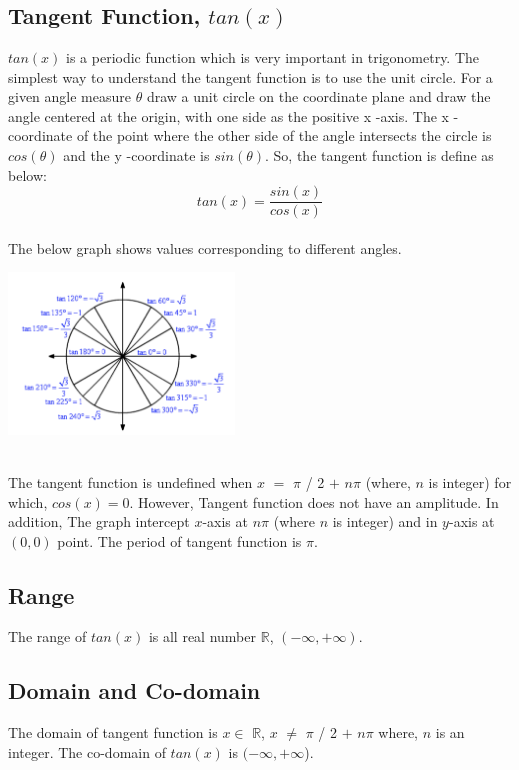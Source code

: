 \documentclass[letterpaper, 11pt]{report}
\begin{document}
\section*{}

 \subsection*{ Tangent Function, $tan(x)$ } 
 
 \normalsize{ \cite{test1} $tan(x)$  is a periodic function which is very important in trigonometry. The simplest way to understand the tangent function is to use the unit circle. For a given angle measure $\theta$ draw a unit circle on the coordinate plane and draw the angle centered at the origin, with one side as the positive  x -axis. The  x -coordinate of the point where the other side of the angle intersects the circle is $cos(θ)$ and the  y -coordinate is $sin(θ)$. So, the tangent function is define as below: \[tan(x) = \frac{sin(x)}{cos(x)}\]\\}
The below graph shows values corresponding to different angles.
 \begin{center}
\includegraphics[width= 6cm]{images/tan3.png}
\end{center}
 \\
 \normalsize{ \cite{test1}\cite{varsitytutors}The tangent function is undefined when $x$ $=$ $\pi$ / 2 $+$ $n \pi$ (where, $n$ is integer) for which, $cos(x) = 0$. However, Tangent function does not have an amplitude. In addition, The graph intercept $x$-axis at $n\pi$ (where $n$ is integer) and in $y$-axis at $(0,0)$ point. The period of tangent function is $\pi$.
 }
 \\
 \subsection*{Range}\cite{test1}\cite{varsitytutors}
 \normalsize{ The range of $tan(x)$ is all real number $\mathbb{R}$, $(- \infty, + \infty)$. }
 
 \subsection*{Domain and Co-domain}\cite{test1}\cite{varsitytutors}
 \normalsize{The domain of tangent function is $x \in$ $\mathbb{R}$, $x$ $\neq$ $\pi$ / 2 $+$ $n \pi$ where, $n$ is an integer. The co-domain of $tan(x)$ is \((-\infty, +\infty\)).}
 
\end{document}
